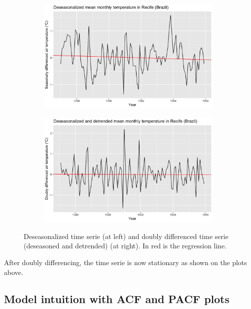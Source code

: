 \begin{figure}[H]
	\centering
	\begin{subfigure}{0.49\textwidth}
		\centering
		\includegraphics[width=\textwidth]{figures/box_jenkins/deseasonalized_time_serie.png}
		\label{fig:deseasonalized-time-serie}
	\end{subfigure}
	\begin{subfigure}{0.49\textwidth}
		\centering
		\includegraphics[width=\textwidth]{figures/box_jenkins/doubly_differenced_time_serie.png}
		\label{fig:doubly-differenced-time-serie}
	\end{subfigure}
	\caption{Deseasonalized time serie (at left) and doubly differenced time serie (deseasoned and detrended) (at right). In red is the regression line.}
\end{figure}

After doubly differencing, the time serie is now stationary as shown on the plots above.

\subsection{Model intuition with ACF and PACF plots}

